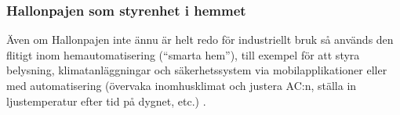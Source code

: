 \documentclass[a4paper,12pt]{article}
\begin{document}
\begin{multicols}{2}
\subsubsection{Hallonpajen som styrenhet i hemmet}

Även om Hallonpajen inte ännu är helt redo för industriellt bruk så används den flitigt inom hemautomatisering (\enquote{smarta hem}), till exempel för att styra belysning, klimatanläggningar och säkerhetssystem via mobilapplikationer eller med automatisering (övervaka inomhusklimat och justera AC:n, ställa in ljustemperatur efter tid på dygnet, etc.) \cite{iotsmarthomeautomation}.

\end{multicols}

\clearpage\printbibliography
\end{document}
